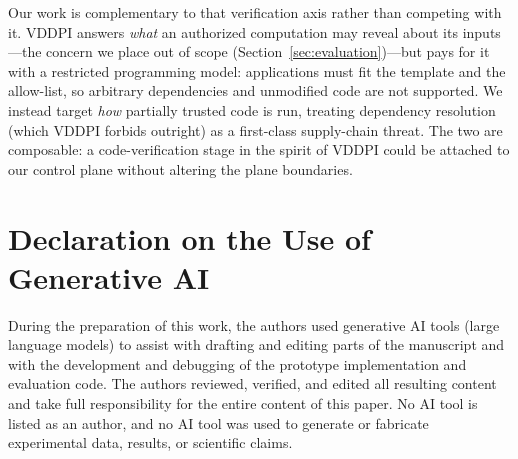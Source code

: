 \documentclass[runningheads]{llncs}
\begin{document}
Our work is complementary to that verification axis rather than competing with it. VDDPI
answers \emph{what} an authorized computation may reveal about its inputs---the concern we
place out of scope (Section~\ref{sec:evaluation})---but pays for it with a restricted
programming model: applications must fit the template and the allow-list, so arbitrary
dependencies and unmodified code are not supported. We instead target \emph{how} partially
trusted code is run, treating dependency resolution (which VDDPI forbids outright) as a
first-class supply-chain threat. The two are composable: a code-verification stage in the
spirit of VDDPI could be attached to our control plane without altering the plane
boundaries.





\section*{Declaration on the Use of Generative AI}

During the preparation of this work, the authors used generative AI tools (large language
models) to assist with drafting and editing parts of the manuscript and with the
development and debugging of the prototype implementation and evaluation code. The authors
reviewed, verified, and edited all resulting content and take full responsibility for the
entire content of this paper. No AI tool is listed as an author, and no AI tool was used to
generate or fabricate experimental data, results, or scientific claims.



\end{document}
